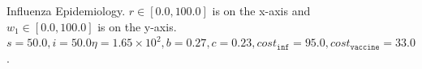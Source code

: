 \begin{figure}[h!]
    \centering
    \caption{Influenza Epidemiology. $ r \in \left[ 0.0, 100.0 \right]$ is on the x-axis and $ w_1 \in \left[ 0.0, 100.0 \right]$ is on the y-axis. $ s = 50.0, i = 50.0 \eta = 1.65 \times 10^2, b = 0.27, c = 0.23, cost_{\mathtt{inf}} = 95.0, cost_{\mathtt{vaccine}} = 33.0$.}
    \label{fig:robot1d}
\end{figure}

